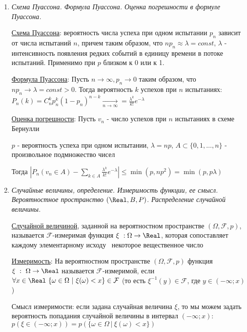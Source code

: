 \begin{enumerate}
    \item \textit{Схема Пуассона. Формула Пуассона. Оценка погрешности в формуле Пуассона.}
    
    \hyperlink{poissonschema}{Схема Пуассона}: вероятность числа успеха при одном испытании $p_n$ зависит от числа испытаний $n$, причем таким образом, что $n p_n \approx \lambda = const$, 
    $\lambda$ - интенсивность появления редких событий в единицу времени в потоке испытаний. Применимо при $p$ близком к 0 или к 1.

    \hyperlink{poissonformula}{Формула Пуассона}: \Ths Пусть $n \to \infty, p_n \to 0$ таким образом, что $n p_n \to \lambda = const > 0$.
    Тогда вероятность $k$ успехов при $n$ испытаниях: $P_n(k) = C^k_n p_n^k (1 - p_n)^{n - k} \underset{n \to \infty}{\rightarrow} = \frac{\lambda^k}{k!} e^{-\lambda}$

    \hyperlink{errorinpoissonformula}{Оценка погрешности}: \Ths Пусть $v_n$ - число успехов при $n$ испытаниях в схеме Бернулли

    $p$ - вероятность успеха при одном испытании, $\lambda = np$, $A \subset \{0, 1, \dots, n\}$ - произвольное подмножество чисел

    Тогда $|P_n (v_n \in A) - \sum_{k \in A} \frac{\lambda^k}{k!} e^{-\lambda}| \leq \min (p, np^2) = \min (p, p\lambda)$

    \item \textit{Случайные величины, определение. Измеримость функции, ее смысл. Вероятностное пространство $(\Real, B, P)$. Распределение случайной величины.}

    \hyperlink{randomvaluedefinition}{Случайной величиной}, заданной на вероятностном пространстве $(\Omega, \mathcal{F}, p)$, называется
    $\mathcal{F}$-измеримая функция $\xi \ : \Omega \to \Real$, которая сопоставляет каждому элементарному исходу \
    некоторое вещественное число

    \hyperlink{measurabilityoffunction}{Измеримость}: На вероятностном пространстве $(\Omega, \mathcal{F}, p)$ функция $\xi \ : \ \Omega \to \Real$ называется
    $\mathcal{F}$-измеримой, если $\forall x \in \Real \ \{\omega \in \Omega \ | \ \xi(\omega) < x\} \in \mathcal{F}$
    (то есть $\xi^{-1}(y) \in \mathcal{F}$, где $y \in (-\infty; x)$)

    Смысл измеримости: если задана случайная величина $\xi$, то мы можем задать вероятность попадания случайной
    величины в интервал $(-\infty; x)$: $p(\xi \in (-\infty; x)) = p(\{\omega \in \Omega \ | \ \xi(\omega) < x\})$


\end{enumerate}
